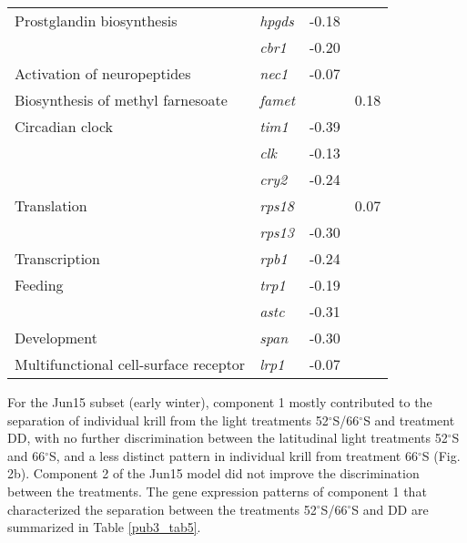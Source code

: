 \begin{table}[]
\begin{tabular}{@{}llll@{}}
Prostglandin biosynthesis             & \textit{hpgds}  & \cellcolor[HTML]{C0C0C0}-0.18 &                   \\
                                      & \textit{cbr1}   & \cellcolor[HTML]{C0C0C0}-0.20 &                   \\
Activation of neuropeptides           & \textit{nec1}   & \cellcolor[HTML]{C0C0C0}-0.07 &                   \\
Biosynthesis of methyl farnesoate     & \textit{famet}  & \cellcolor[HTML]{C0C0C0}      & 0.18              \\
Circadian clock                       & \textit{tim1}   & \cellcolor[HTML]{C0C0C0}-0.39 &                   \\
                                      & \textit{clk}    & \cellcolor[HTML]{C0C0C0}-0.13 &                   \\
                                      & \textit{cry2}   & \cellcolor[HTML]{C0C0C0}-0.24 &                   \\
Translation                           & \textit{rps18}  & \cellcolor[HTML]{C0C0C0}      & 0.07              \\
                                      & \textit{rps13}  & \cellcolor[HTML]{C0C0C0}-0.30 &                   \\
Transcription                         & \textit{rpb1}   & \cellcolor[HTML]{C0C0C0}-0.24 &                   \\
Feeding                               & \textit{trp1}   & \cellcolor[HTML]{C0C0C0}-0.19 &                   \\
                                      & \textit{astc}   & \cellcolor[HTML]{C0C0C0}-0.31 &                   \\
Development                           & \textit{span}   & \cellcolor[HTML]{C0C0C0}-0.30 &                   \\
Multifunctional cell-surface receptor & \textit{lrp1}   & \cellcolor[HTML]{C0C0C0}-0.07 &                   \\ \bottomrule
\end{tabular}
\end{table}

For the Jun15 subset (early winter), component 1 mostly contributed to the
separation of individual krill from the light treatments
52$^{\circ}$S/66$^{\circ}$S and treatment DD, with no further discrimination
between the latitudinal light treatments 52$^{\circ}$S and 66$^{\circ}$S, and a
less distinct pattern in individual krill from treatment 66$^{\circ}$S (Fig.
2b). Component 2 of the Jun15 model did not improve the discrimination between
the treatments. The gene expression patterns of component 1 that characterized
the separation between the treatments 52$^{\circ}$S/66$^{\circ}$S and DD are
summarized in Table \ref{pub3_tab5}.

